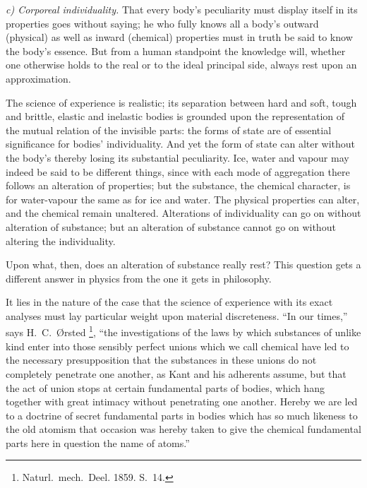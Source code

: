 \documentclass[12pt,a4paper]{book}
\newcommand{\runin}[1]{\emph{#1}\hspace{0.4em}}
\begin{document}
\runin{c) Corporeal individuality.} That every body's peculiarity must display itself in its properties goes without
saying; he who fully knows all a body's outward (physical) as well as inward (chemical) properties must in truth be
said to know the body's essence. But from a human standpoint the knowledge will, whether one otherwise holds to the
real or to the ideal principal side, always rest upon an approximation.

The science of experience is realistic; its separation between hard and soft, tough and brittle, elastic and inelastic
bodies is grounded upon the representation of the mutual relation of the invisible parts: the forms of state are of
essential significance for bodies' individuality. And yet the form of state can alter without the body's thereby losing
its substantial peculiarity. Ice, water and vapour may indeed be said to be different things, since with each mode of
aggregation there follows an alteration of properties; but the
substance, the chemical character, is for water-vapour the same as for ice and water. The physical properties can
alter, and the chemical remain unaltered. Alterations of individuality can go on without alteration of substance; but
an alteration of substance cannot go on without altering the individuality.

Upon what, then, does an alteration of substance really rest? This question gets a different answer in physics from
the one it gets in philosophy.

It lies in the nature of the case that the science of experience with its exact analyses must lay particular weight
upon material discreteness. ``In our times,'' says H.\ C.\ Ørsted%
\footnote{%
Naturl.\ mech.\ Deel. 1859. S.\ 14.}, ``the investigations of the laws by which substances of unlike kind enter into
those sensibly perfect unions which we call chemical have led to the necessary presupposition that the substances in
these unions do not completely penetrate one another, as Kant and his adherents assume, but that the act of union
stops at certain fundamental parts of bodies, which hang together with great intimacy without penetrating one another.
Hereby we are led to a doctrine of secret fundamental parts in bodies which has so much likeness to the old atomism
that occasion was hereby taken to give the chemical fundamental parts here in question the name of atoms.''
\end{document}
